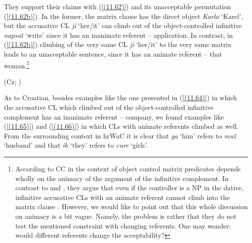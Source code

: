 They support their claims with (\ref{(11.62)}) and its unacceptable permutation (\ref{(11.62b)}). In the former, the matrix clause has the direct object \textit{Karla} ‘Karel’, but the accusative CL \textit{ji} ‘her/it’ can climb out of the object-controlled infinitive \textit{napsat} ‘write’ since it has an inanimate referent – application. In contrast, in (\ref{(11.62b)}) climbing of the very same CL \textit{ji} ‘her/it’ to the very same matrix leads to an unacceptable sentence, since it has an animate referent – that woman.\footnote{According to \citet[245]{LelandToman76} CC in the context of object control matrix predicates depends wholly on the animacy of the argument of the infinitive complement. In contrast to \citet{Dotlacil04} and \citet{Rezac05}, they argue that even if the controller is a NP in the dative, infinitive accusative CLs with an animate referent cannot climb into the matrix clause \citep[cf.][245]{LelandToman76}. However, we would like to point out that this whole discussion on animacy is a bit vague. Namely, the problem is rather that they do not test the mentioned constraint with changing referents. One may wonder: would different referents change the acceptability?}

\begin{exe}\ex
\begin{xlist}
\hfill (Cz; \citealt[241]{LelandToman76})
\end{xlist}
\end{exe}


\noindent As to Croatian, besides examples like the one presented in (\ref{(11.64)}) in which the accusative CL which climbed out of the object-controlled infinitive complement has an inanimate referent – company, we found examples like (\ref{(11.65)}) and (\ref{(11.66)}) in which CLs with animate referents climbed as well. From the surrounding context in hrWaC it is clear that \textit{ga} ‘him’ refers to \textit{muž} ‘husband’ and that \textit{ih} ‘they’ refers to \textit{cure} ‘girls’.

